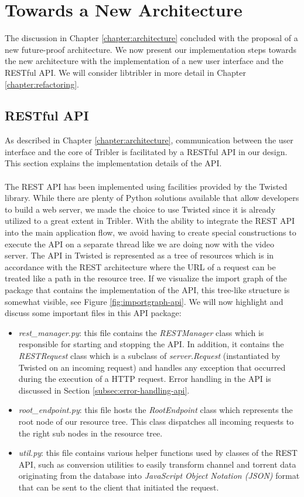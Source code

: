 \chapter{Towards a New Architecture}
\label{chapter:towards-new-architecture}
The discussion in Chapter \ref{chapter:architecture} concluded with the proposal of a new future-proof architecture. We now present our implementation steps towards the new architecture with the implementation of a new user interface and the RESTful API. We will consider libtribler in more detail in Chapter \ref{chapter:refactoring}.

\section{RESTful API}
As described in Chapter \ref{chapter:architecture}, communication between the user interface and the core of Tribler is facilitated by a RESTful API in our design. This section explains the implementation details of the API.\\\\
The REST API has been implemented using facilities provided by the Twisted library. While there are plenty of Python solutions available that allow developers to build a web server, we made the choice to use Twisted since it is already utilized to a great extent in Tribler. With the ability to integrate the REST API into the main application flow, we avoid having to create special constructions to execute the API on a separate thread like we are doing now with the video server. The API in Twisted is represented as a tree of resources which is in accordance with the REST architecture where the URL of a request can be treated like a path in the resource tree. If we visualize the import graph of the package that contains the implementation of the API, this tree-like structure is somewhat visible, see Figure \ref{fig:importgraph-api}. We will now highlight and discuss some important files in this API package:
\begin{itemize}
	\item \emph{rest\_manager.py}: this file contains the \emph{RESTManager} class which is responsible for starting and stopping the API. In addition, it  contains the \emph{RESTRequest} class which is a subclass of \emph{server.Request} (instantiated by Twisted on an incoming request) and handles any exception that occurred during the execution of a HTTP request. Error handling in the API is discussed in Section  \ref{subsec:error-handling-api}.
	\item \emph{root\_endpoint.py}: this file hosts the \emph{RootEndpoint} class which represents the root node of our resource tree. This class dispatches all incoming requests to the right sub nodes in the resource tree.
	\item \emph{util.py}: this file contains various helper functions used by classes of the REST API, such as conversion utilities to easily transform channel and torrent data originating from the database into \emph{JavaScript Object Notation (JSON)} format that can be sent to the client that initiated the request.
\end{itemize}


